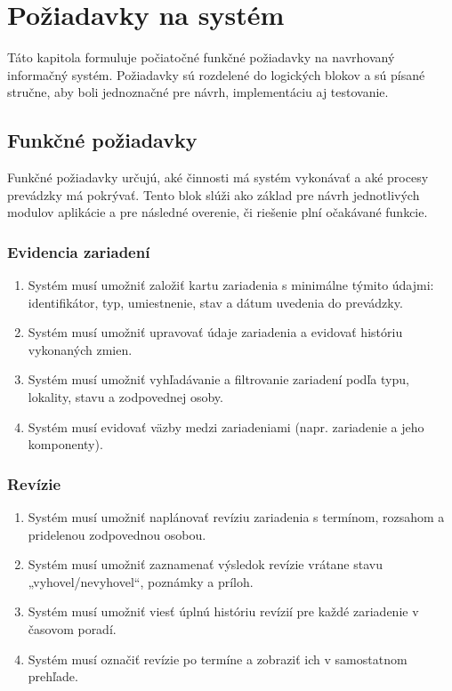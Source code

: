 
\chapter{Požiadavky na systém}\label{ch:functional-requirements}

Táto kapitola formuluje počiatočné funkčné požiadavky na navrhovaný informačný systém. Požiadavky sú rozdelené do logických blokov a sú písané stručne, aby boli jednoznačné pre návrh, implementáciu aj testovanie.

\section{Funkčné požiadavky}

Funkčné požiadavky určujú, aké činnosti má systém vykonávať a aké procesy prevádzky má pokrývať. Tento blok slúži ako základ pre návrh jednotlivých modulov aplikácie a pre následné overenie, či riešenie plní očakávané funkcie.

\subsection{Evidencia zariadení}

\begin{enumerate}
\item Systém musí umožniť založiť kartu zariadenia s minimálne týmito údajmi: identifikátor, typ, umiestnenie, stav a dátum uvedenia do prevádzky.
\item Systém musí umožniť upravovať údaje zariadenia a evidovať históriu vykonaných zmien.
\item Systém musí umožniť vyhľadávanie a filtrovanie zariadení podľa typu, lokality, stavu a zodpovednej osoby.
\item Systém musí evidovať väzby medzi zariadeniami (napr. zariadenie a jeho komponenty).
\end{enumerate}

\subsection{Revízie}

\begin{enumerate}
\item Systém musí umožniť naplánovať revíziu zariadenia s termínom, rozsahom a pridelenou zodpovednou osobou.
\item Systém musí umožniť zaznamenať výsledok revízie vrátane stavu „vyhovel/nevyhovel“, poznámky a príloh.
\item Systém musí umožniť viesť úplnú históriu revízií pre každé zariadenie v časovom poradí.
\item Systém musí označiť revízie po termíne a zobraziť ich v samostatnom prehľade.
\end{enumerate}


